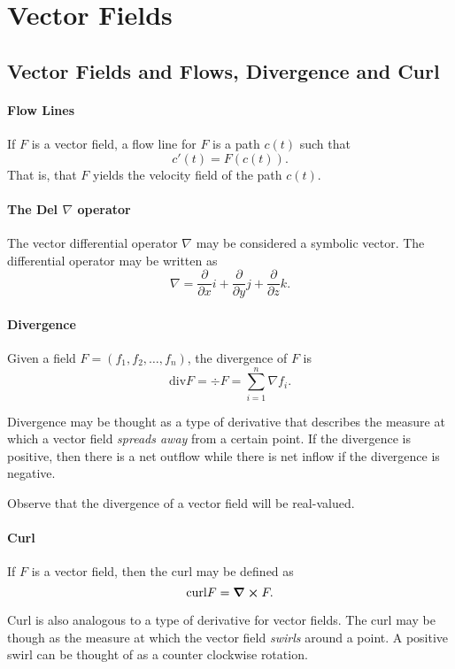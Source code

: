 \section{Vector Fields}

\subsection{Vector Fields and Flows, Divergence and Curl}
\paragraph{Flow Lines}
If \(F\) is a vector field, a flow line for \(F\) is a path \(c(t)\)
such that
\[c'(t) = F(c(t)).\]
That is, that \(F\) yields the velocity field of the path \(c(t)\).

\paragraph{The Del \(\nabla\) operator}
The vector differential operator \(\nabla\) may be considered a 
symbolic vector.
The differential operator may be written as 
\[\nabla = \frac{\partial}{\partial x}i + \frac{\partial}{\partial y}j + \frac{\partial}{\partial z}k.\]

\paragraph{Divergence}
Given a field \(F = (f_1, f_2, \dots, f_n)\), the divergence of \(F\) is
\[\text{div} F = \div F = \sum_{i=1}^n \nabla f_i.\]

Divergence may be thought as a type of derivative that describes the measure at which 
a vector field \textit{spreads away} from a certain point.
If the divergence is positive, then there is a net outflow while there is net inflow if the divergence is negative.

Observe that the divergence of a vector field will be real-valued.

\paragraph{Curl}
If \(F\) is a vector field, then the curl may be defined as
\[\mathrm{curl}F = \curl F.\]

Curl is also analogous to a type of derivative for vector fields. The curl may be though as the measure at which the vector field \textit{swirls} around a point.
A positive swirl can be thought of as a counter clockwise rotation.

